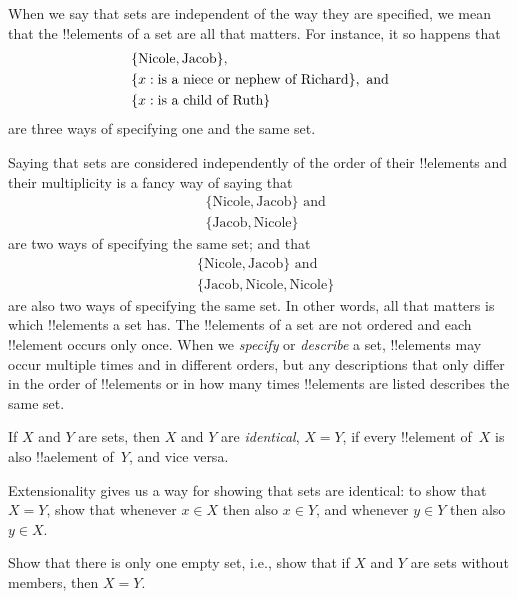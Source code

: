 \documentclass[../../../include/open-logic-section]{subfiles}
\begin{document}
\begin{explain}
When we say that sets are independent of the way they are specified,
we mean that the !!{element}s of a set are all that matters. For instance,
it so happens that
\begin{align*}
  & \{\text{Nicole}, \text{Jacob}\},\\
  & \Setabs{x}{\text{is a niece or nephew of Richard}}, \text{ and}\\
  & \Setabs{x}{\text{is a child of Ruth}}
\end{align*}
are three ways of specifying one and the same set.

Saying that sets are considered independently of the order of their
!!{element}s and their multiplicity is a fancy way of saying that
\begin{align*}
  & \{\text{Nicole}, \text{Jacob}\} \text{ and}\\
  & \{\text{Jacob}, \text{Nicole}\}
\end{align*}
are two ways of specifying the same set; and that
\begin{align*}
  & \{\text{Nicole}, \text{Jacob}\} \text{ and}\\
  & \{\text{Jacob}, \text{Nicole}, \text{Nicole}\}
\end{align*}
are also two ways of specifying the same set.  In other words, all
that matters is which !!{element}s a set has. The !!{element}s of a
set are not ordered and each !!{element} occurs only once. When we
\emph{specify} or \emph{describe} a set, !!{element}s may occur
multiple times and in different orders, but any descriptions that only
differ in the order of !!{element}s or in how many times !!{element}s
are listed describes the same set.
\end{explain}

\begin{defn}[Extensionality]
  If $X$ and $Y$ are sets, then $X$ and $Y$ are \emph{identical}, $X =
  Y$, if every !!{element} of~$X$ is also !!a{element} of~$Y$, and
  vice versa.
\end{defn}

\begin{explain}
Extensionality gives us a way for showing that sets are identical: to
show that $X = Y$, show that whenever $x \in X$ then also $x \in Y$,
and whenever $y \in Y$ then also $y \in X$.
\end{explain}

\begin{prob}
Show that there is only one empty set, i.e., show that if $X$ and $Y$
are sets without members, then $X = Y$.
\end{prob}
\end{document}
